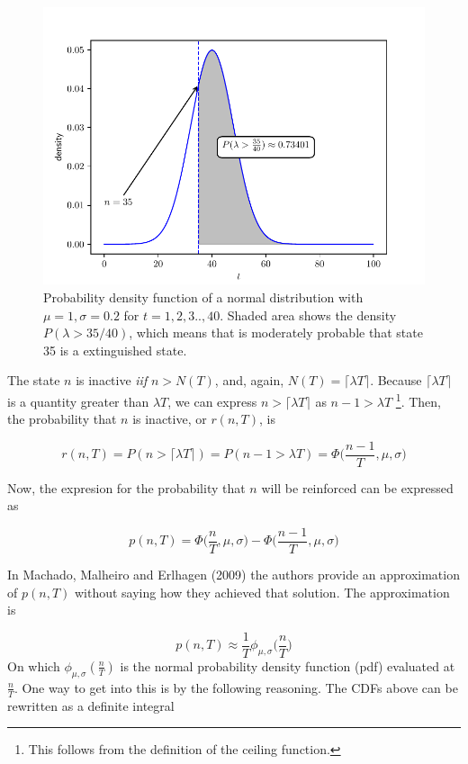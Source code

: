 \documentclass[11pt]{article}
\begin{document}
    \begin{figure}[H]
        \centering
        \includegraphics[scale=0.7]{lambda_nT}
        \caption{Probability density function of a normal distribution with $\mu = 1, \sigma = 0.2$ for $t = 1,2,3..,40$.
        Shaded area shows the density $P(\lambda > 35/40)$, which means that is moderately probable that state 35
        is a extinguished state.}
    \end{figure}

    The state $n$ is inactive \textit{iif} $n > N(T)$, and, again, $N(T) = \lceil \lambda T \rceil$.
    Because $\lceil \lambda T \rceil$ is a quantity greater than $\lambda T$, we can express $n > \lceil \lambda T \rceil$
    as $n - 1 > \lambda T$ \footnote{This follows from the definition of the ceiling function.}.
    Then, the probability that $n$ is inactive, or $r(n,T)$, is

    \[
        r(n,T) = P(n > \lceil \lambda T \rceil) = P(n - 1 > \lambda T) = \Phi \Big( \frac{n-1}{T},\mu,\sigma \Big)
    \]

    Now, the expresion for the probability that $n$ will be reinforced can be expressed as

    \[
        p(n,T) = \Phi \Big ( \frac{n}{T}, \mu, \sigma \Big) - \Phi \Big ( \frac{n - 1}{T},\mu,\sigma \Big)
    \]

    In Machado, Malheiro and Erlhagen (2009) the authors provide an approximation of $p(n,T)$ without saying how they
    achieved that solution. The approximation is

    \[
        p(n,T) \approx \frac{1}{T} \phi_{\mu,\sigma} \Big(\frac{n}{T}\Big)
    \]
    On which $\phi_{\mu,\sigma}(\frac{n}{T})$ is the normal probability density function (pdf) evaluated at $\frac{n}{T}$.
    One way to get into this is by the following reasoning. The CDFs above can be rewritten as a definite integral
\end{document}
